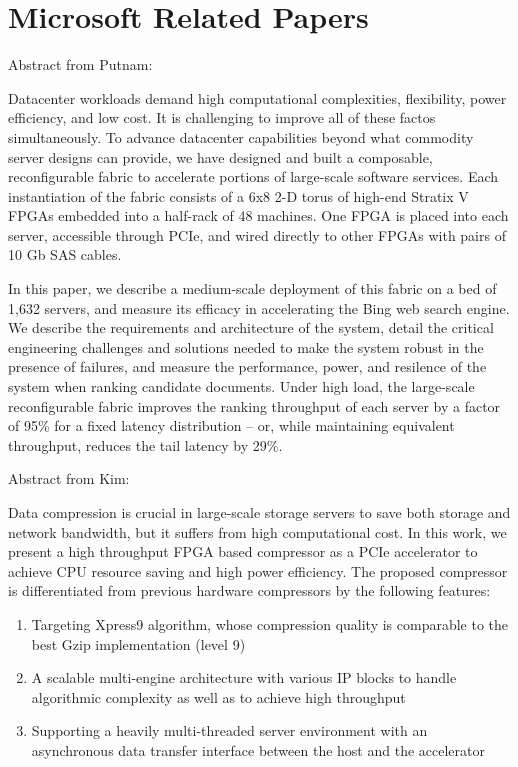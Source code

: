 \chapter{Microsoft Related Papers}
Abstract from Putnam\cite{15}:

Datacenter workloads demand high computational complexities,
flexibility, power efficiency, and low cost. It is challenging to
improve all of these factos simultaneously. To advance datacenter
capabilities beyond what commodity server designs can provide, we
have designed and built a composable, reconfigurable fabric to
accelerate portions of large-scale software services.
Each instantiation of the fabric consists of a 6x8 2-D torus of
high-end Stratix V FPGAs embedded into a half-rack of 48
machines. One FPGA is placed into each server, accessible through
PCIe, and wired directly to other FPGAs with pairs of 10 Gb SAS
cables.

In this paper, we describe a medium-scale deployment of
this fabric on a bed of 1,632 servers, and measure its efficacy in
accelerating the Bing web search engine. We describe the
requirements and architecture of the system, detail the
critical engineering challenges and solutions needed to make
the system robust in the presence of failures, and measure
the performance, power, and resilence of the system when
ranking candidate documents. Under high load, the
large-scale reconfigurable fabric improves the ranking throughput
of each server by a factor of 95\% for a fixed latency distribution --
or, while maintaining equivalent throughput, reduces the tail 
latency by 29\%.

Abstract from Kim\cite{16}:

Data compression is crucial in large-scale storage servers to save
both storage and network bandwidth, but it suffers from high
computational cost. In this work, we present a high throughput FPGA
based compressor as a PCIe accelerator to achieve CPU resource saving
and high power efficiency. The proposed compressor is differentiated
from previous hardware compressors by the following features:
\begin{enumerate}
\item Targeting Xpress9 algorithm, whose compression quality is comparable 
to the best Gzip implementation (level 9)
\item A scalable multi-engine architecture with various IP blocks to handle
algorithmic complexity as well as to achieve high throughput
\item Supporting a heavily multi-threaded server environment with an 
asynchronous data transfer interface between the host and the accelerator
\end{enumerate}

